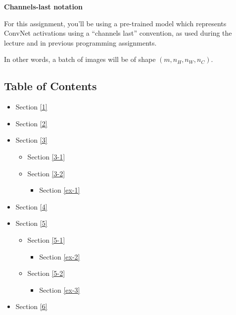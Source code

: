 \documentclass[11pt]{article}
\providecommand{\tightlist}{%
      \setlength{\itemsep}{0pt}\setlength{\parskip}{0pt}}
\begin{document}
\textbf{Channels-last notation}

For this assignment, you'll be using a pre-trained model which
represents ConvNet activations using a ``channels last'' convention, as
used during the lecture and in previous programming assignments.

In other words, a batch of images will be of shape
\((m, n_H, n_W, n_C)\).

    \hypertarget{table-of-contents}{%
\subsection{Table of Contents}\label{table-of-contents}}

\begin{itemize}
\tightlist
\item
  Section \ref{1}
\item
  Section \ref{2}
\item
  Section \ref{3}

  \begin{itemize}
  \tightlist
  \item
    Section \ref{3-1}
  \item
    Section \ref{3-2}

    \begin{itemize}
    \tightlist
    \item
      Section \ref{ex-1}
    \end{itemize}
  \end{itemize}
\item
  Section \ref{4}
\item
  Section \ref{5}

  \begin{itemize}
  \tightlist
  \item
    Section \ref{5-1}

    \begin{itemize}
    \tightlist
    \item
      Section \ref{ex-2}
    \end{itemize}
  \item
    Section \ref{5-2}

    \begin{itemize}
    \tightlist
    \item
      Section \ref{ex-3}
    \end{itemize}
  \end{itemize}
\item
  Section \ref{6}
\end{itemize}
\end{document}
